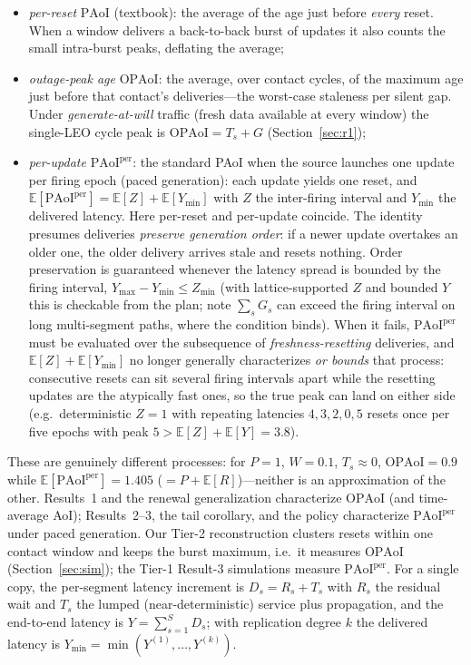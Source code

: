 \documentclass[twocolumn,3p,times,procedia]{elsarticle}
\newcommand{\PAoI}{\mathrm{PAoI}}
\newcommand{\OPAoI}{\mathrm{OPAoI}}
\newcommand{\PAoIper}{\mathrm{PAoI}^{\mathrm{per}}}
\newcommand{\E}{\mathbb{E}}
\newcommand{\Ymin}{Y_{\min}}
\begin{document}
\begin{itemize}
\item \emph{per-reset} $\PAoI$ (textbook): the average of the age just
before \emph{every} reset. When a window delivers a back-to-back burst
of updates it also counts the small intra-burst peaks, deflating the
average;
\item \emph{outage-peak age} $\OPAoI$: the average, over contact
cycles, of the maximum age just before that contact's deliveries---the
worst-case staleness per silent gap. Under \emph{generate-at-will}
traffic (fresh data available at every window) the single-LEO cycle
peak is $\OPAoI=T_s+G$ (Section~\ref{sec:r1});
\item \emph{per-update} $\PAoIper$: the standard PAoI when the source
launches one update per firing epoch (paced generation): each update
yields one reset, and $\E[\PAoIper]=\E[Z]+\E[\Ymin]$ with $Z$ the
inter-firing interval and $\Ymin$ the delivered latency. Here per-reset
and per-update coincide. The identity presumes deliveries
\emph{preserve generation order}: if a newer update overtakes an older
one, the older delivery arrives stale and resets nothing. Order
preservation is guaranteed whenever the latency spread is bounded by
the firing interval, $Y_{\max}-Y_{\min}\le Z_{\min}$ (with
lattice-supported $Z$ and bounded $Y$ this is checkable from the plan;
note $\sum_s G_s$ can exceed the firing interval on long multi-segment
paths, where the condition binds). When it fails, $\PAoIper$ must be
evaluated over the subsequence of \emph{freshness-resetting}
deliveries, and $\E[Z]+\E[\Ymin]$ no longer generally characterizes
\emph{or bounds} that process: consecutive resets can sit several
firing intervals apart while the resetting updates are the atypically
fast ones, so the true peak can land on either side (e.g.\
deterministic $Z{=}1$ with repeating latencies $4,3,2,0,5$ resets once
per five epochs with peak $5>\E[Z]{+}\E[Y]{=}3.8$).
\end{itemize}
These are genuinely different processes: for $P{=}1$, $W{=}0.1$,
$T_s{\approx}0$, $\OPAoI=0.9$ while $\E[\PAoIper]=1.405$
($=P+\E[R]$)---neither is an approximation of the other.
Results~1 and the renewal generalization characterize $\OPAoI$ (and
time-average AoI); Results~2--3, the tail corollary, and the policy
characterize $\PAoIper$ under paced generation. Our Tier-2
reconstruction clusters resets within one contact window and keeps the
burst maximum, i.e.\ it measures $\OPAoI$
(Section~\ref{sec:sim}); the Tier-1 Result-3 simulations measure
$\PAoIper$. For a single copy, the per-segment latency
increment is $D_s=R_s+T_s$ with $R_s$ the residual wait and $T_s$ the
lumped (near-deterministic) service plus propagation, and the end-to-end
latency is $Y=\sum_{s=1}^S D_s$; with replication degree $k$ the delivered
latency is $\Ymin=\min(Y^{(1)},\dots,Y^{(k)})$.
\end{document}
